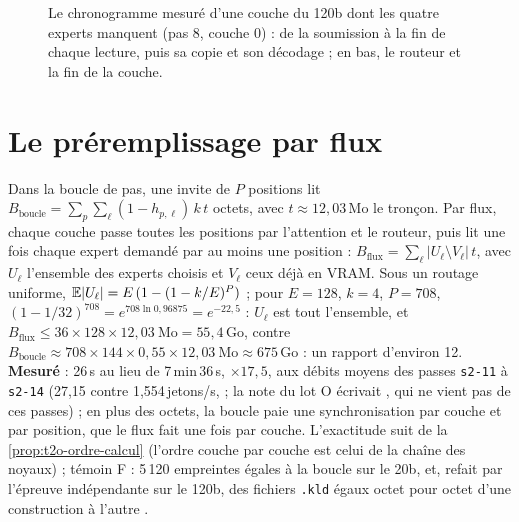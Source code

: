 \begin{figure}[ht]
\centering
\GrapheCchChrono
\caption[Le chronogramme mesuré d'une couche]{Le chronogramme mesuré d'une couche du 120b dont les quatre experts manquent (pas 8, couche 0) : de la soumission à la fin de chaque lecture, puis sa copie et son décodage ; en bas, le routeur et la fin de la couche.}
\label{fig:t2o-chrono}
\end{figure}

\section{Le préremplissage par flux}\label{sec:t2o-flux}

Dans la boucle de pas, une invite de $P$ positions lit $B_{\text{boucle}} = \sum_p\sum_\ell (1 - h_{p,\ell})\,k\,t$ octets, avec $t \approx 12{,}03$\,Mo le tronçon. Par flux, chaque couche passe toutes les positions par l'attention et le routeur, puis lit une fois chaque expert demandé par au moins une position : $B_{\text{flux}} = \sum_\ell |U_\ell \setminus V_\ell|\,t$, avec $U_\ell$ l'ensemble des experts choisis et $V_\ell$ ceux déjà en VRAM. Sous un routage uniforme, $\mathbb{E}|U_\ell| = E\,(1 - (1 - k/E)^P)$ ; pour $E = 128$, $k = 4$, $P = 708$, $(1 - 1/32)^{708} = e^{708\ln 0{,}96875} = e^{-22{,}5}$ : $U_\ell$ est tout l'ensemble, et $B_{\text{flux}} \le 36 \times 128 \times 12{,}03~\text{Mo} = 55{,}4$\,Go, contre $B_{\text{boucle}} \approx 708 \times 144 \times 0{,}55 \times 12{,}03~\text{Mo} \approx 675$\,Go \calc : un rapport d'environ 12. \textbf{Mesuré} : 26\,s au lieu de 7\,min\,36\,s, $\times 17{,}5$, aux débits moyens des passes \texttt{s2-11} à \texttt{s2-14} (27,15 contre 1,554\,jetons/s,  ; la note du lot O écrivait , qui ne vient pas de ces passes) ; en plus des octets, la boucle paie une synchronisation par couche et par position, que le flux fait une fois par couche. L'exactitude suit de la \cref{prop:t2o-ordre-calcul} (l'ordre couche par couche est celui de la chaîne des noyaux) ; témoin F : 5\,120 empreintes égales à la boucle sur le 20b, et, refait par l'épreuve indépendante sur le 120b, des fichiers \texttt{.kld} égaux octet pour octet d'une construction à l'autre \mes.

